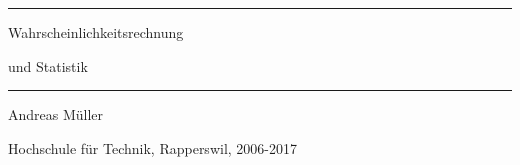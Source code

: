 \documentclass[a4paper,12pt]{book}
\begin{document}
\pagestyle{fancy}
\frontmatter
\newcommand\HRule{\noindent\rule{\linewidth}{1.5pt}}
\begin{titlepage}
\HRule
\vspace*{10pt}
\begin{flushright}
{\Huge
Wahrscheinlichkeitsrechnung}
\end{flushright}
\begin{flushright}
{\Huge und Statistik}
\end{flushright}
\HRule
\begin{flushright}
\vspace{30pt}
\LARGE
Andreas Müller
\end{flushright}
\begin{center}
Hochschule für Technik, Rapperswil, 2006-2017
\end{center}
\end{titlepage}

\newenvironment{beispiele}{
\bgroup\smallskip\parindent0pt\bf Beispiele\egroup

\begin{list}{\arabic{beispiel}.}
  {\usecounter{beispiel}
  \setlength{\labelsep}{5mm}
  \setlength{\rightmargin}{0pt}
}}{\end{list}}
\newenvironment{teilaufgaben}{
\begin{enumerate}
\renewcommand{\labelenumi}{\alph{enumi})}
}{\end{enumerate}}
\newenvironment{beispiel}[1][Beispiel]{%
\begin{proof}[\bf #1]%
\renewcommand{\qedsymbol}{$\bigcirc$}%
}{\end{proof}}
\def\swallow#1{
}
\newenvironment{loesung}{%
\begin{proof}[Lösung]%
\renewcommand{\qedsymbol}{$\bigcirc$}
}{\end{proof}}
\def\keineloesungen{%
\renewenvironment{loesung}{\swallow\begingroup}{\endgroup}%
}

\hypersetup{
    linktoc=all,
    linkcolor=blue
}

\tableofcontents
\newtheorem{satz}{Satz}[chapter]
\newtheorem{hilfssatz}{Hilfssatz}[chapter]
\newtheorem{definition}{Definition}[chapter]
\newtheorem{annahme}{Annahme}[chapter]
\mainmatter
\allowdisplaybreaks












\appendix
%


\clearpage
\pagebreak
\ifodd\value{page}\else\null\clearpage\fi


\end{document}
